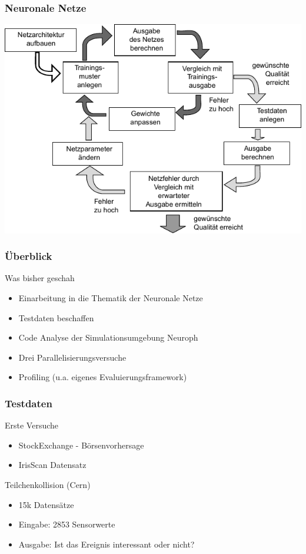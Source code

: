 \documentclass[18pt]{beamer}
\begin{document}
	\begin{frame}[c]\frametitle{Neuronale Netze}
		\begin{center}
		\includegraphics[scale=.8]{images/workflow}
		\end{center}
	\end{frame}		

	\begin{frame}[c]\frametitle{Überblick}
		\begin{block}{Was bisher geschah}
		    \begin{itemize}
		    	\item Einarbeitung in die Thematik der Neuronale Netze
			    \item Testdaten beschaffen
		    	\item Code Analyse der Simulationsumgebung Neuroph
		    	\item Drei Parallelisierungsversuche
		    	\item Profiling (u.a. eigenes Evaluierungsframework)
		    \end{itemize}		    
		\end{block}
	\end{frame}
	
	\begin{frame}[c]\frametitle{Testdaten}
		\begin{block}{Erste Versuche}
		    \begin{itemize}
		    	\item StockExchange - Börsenvorhersage
		    	\item IrisScan Datensatz
		    \end{itemize}
		\end{block}
		\begin{block}{Teilchenkollision (Cern)}
		    \begin{itemize}
		    	\item 15k Datensätze
		    	\item Eingabe: 2853 Sensorwerte
				\item Ausgabe: Ist das Ereignis interessant oder nicht? 
		    \end{itemize}
		\end{block}		
	\end{frame}
\end{document}
